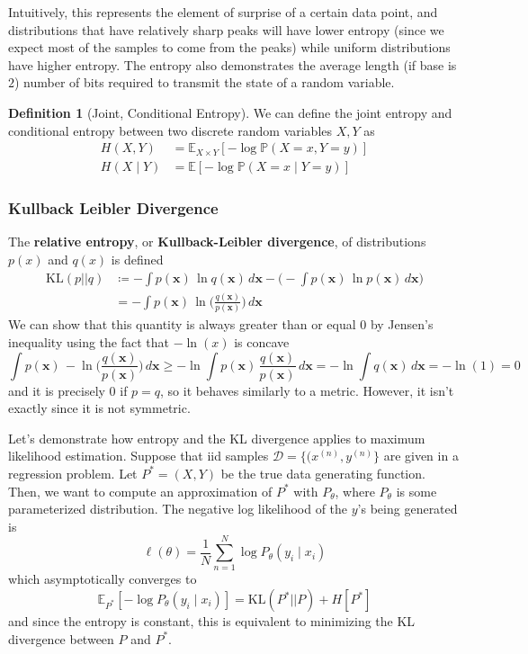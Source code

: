 \documentclass{article}
\theoremstyle{definition}
\newtheorem{definition}{Definition}[section]
\begin{document}
    Intuitively, this represents the element of surprise of a certain data point, and distributions that have relatively sharp peaks will have lower entropy (since we expect most of the samples to come from the peaks) while uniform distributions have higher entropy. The entropy also demonstrates the average length (if base is $2$) number of bits required to transmit the state of a random variable. 

    \begin{definition}[Joint, Conditional Entropy]
    We can define the joint entropy and conditional entropy between two discrete random variables $X, Y$ as 
    \begin{align*}
        H(X, Y) & = \mathbb{E}_{X \times Y} [-\log \mathbb{P}(X = x, Y = y)] \\
        H(X \mid Y) & = \mathbb{E}[- \log \mathbb{P}(X = x \mid Y = y)]
    \end{align*}
    \end{definition}

    \subsubsection{Kullback Leibler Divergence}

    The \textbf{relative entropy}, or \textbf{Kullback-Leibler divergence}, of distributions $p(x)$ and $q(x)$ is defined 
    \begin{align*}
        \mathrm{KL}(p || q) & \coloneqq - \int p(\mathbf{x}) \, \ln{q(\mathbf{x})} \,d\mathbf{x} - \bigg( - \int p(\mathbf{x}) \, \ln{p(\mathbf{x})} \,d\mathbf{x} \bigg) \\
        & = - \int p(\mathbf{x}) \, \ln \bigg( \frac{q(\mathbf{x})}{p(\mathbf{x})} \bigg) \,d\mathbf{x} 
    \end{align*}
    We can show that this quantity is always greater than or equal $0$ by Jensen's inequality using the fact that $-\ln(x)$ is concave
    \[\int p(\mathbf{x}) \, -\ln \bigg( \frac{q(\mathbf{x})}{p(\mathbf{x})} \bigg) \,d\mathbf{x} \geq -\ln \int p(\mathbf{x}) \, \frac{q(\mathbf{x})}{p(\mathbf{x})} \,d\mathbf{x} = -\ln \int q(\mathbf{x}) \,d\mathbf{x} = -\ln(1) = 0\]
    and it is precisely $0$ if $p = q$, so it behaves similarly to a metric. However, it isn't exactly since it is not symmetric. 

    Let's demonstrate how entropy and the KL divergence applies to maximum likelihood estimation. Suppose that iid samples $\mathcal{D} = \{(x^{(n)}, y^{(n)}\}$ are given in a regression problem. Let $P^\ast = (X, Y)$ be the true data generating function. Then, we want to compute an approximation of $P^\ast$ with $P_\theta$, where $P_\theta$ is some parameterized distribution. The negative log likelihood of the $y$'s being generated is 
    \[\ell(\theta) = \frac{1}{N} \sum_{n=1}^N \log P_\theta (y_i \mid x_i)\]
    which asymptotically converges to 
    \[\mathbb{E}_{P^\ast} [ -\log P_\theta (y_i \mid x_i)] = \mathrm{KL}(P^\ast || P) + H[P^\ast]\]
    and since the entropy is constant, this is equivalent to minimizing the KL divergence between $P$ and $P^\ast$. 
\end{document}
